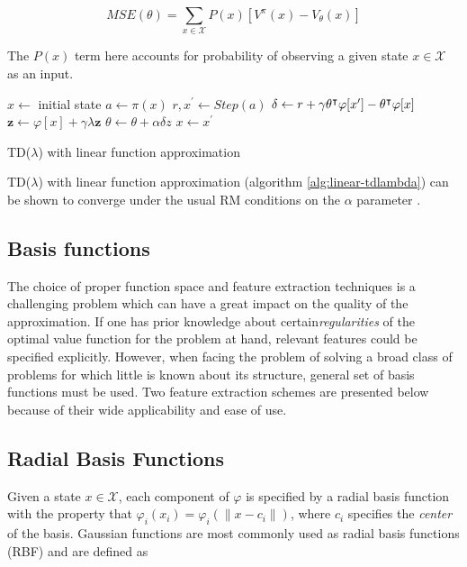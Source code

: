 \begin{equation}
MSE(\theta) = \sum_{ x \in \mathcal{X}} P(x) \left[ V^\pi(x) - V_\theta(x) \right]
\end{equation}

The $P(x)$ term here accounts for probability of observing a given state $x \in \mathcal{X}$ as an input.

\begin{algorithm}
\DontPrintSemicolon
{}
$x \leftarrow$ initial state\;
 {
$a \leftarrow \pi(x)$\;
$r, x^\prime \leftarrow Step(a)$\;
$\delta \leftarrow r + \gamma \theta^\intercal \varphi[x^\prime] -
\theta^\intercal \varphi[x]$\;
$\mathbf{z} \leftarrow \varphi[x] + \gamma \lambda \mathbf{z}$ \;
$\theta \leftarrow \theta + \alpha \delta z$\;
$x \leftarrow x^\prime$
}
\caption{TD($\lambda$) with linear function approximation}
\label{alg:linear-tdlambda}
\end{algorithm}

TD($\lambda$) with linear function approximation (algorithm \ref{alg:linear-tdlambda}) can be shown to converge under the usual RM conditions on the $\alpha$
parameter \parencite{Tsitsiklis1997}.

\subsection{Basis functions}

The choice of proper function space and feature extraction techniques is a challenging problem which can have a great impact on the quality of the approximation. If one has prior knowledge about certain\textit{regularities} of the optimal value function for the problem at hand, relevant features could be
specified explicitly. However, when facing the problem of solving a broad class of
problems for which little is known about its structure, general set of basis functions
must be used. Two feature extraction schemes are presented below because of their wide
applicability and ease of use. 

\subsection{Radial Basis Functions}

Given a state $x \in \mathcal{X}$, each component of $\varphi$ is specified by a radial basis function with the property that $\varphi_i(x_i) = \varphi_i(\|x - c_i\|)$, where $c_i$ specifies the \textit{center} of the basis. Gaussian functions are most commonly used as radial basis functions (RBF) and are defined as

